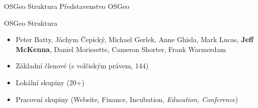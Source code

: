 \documentclass[xcolor=dvipsnames]{beamer}
\begin{document}
\begin{frame}{OSGeo Struktura}
    Představenstvo OSGeo
    \begin{center}
    \end{center}

\end{frame}
\begin{frame}{OSGeo Struktura}
\begin{itemize}
    \item Peter Batty, Jáchym Čepický, Michael Gerlek, Anne Ghisla, Mark Lucas,
        {\bf Jeff McKenna}, Daniel Morissette, Cameron Shorter, Frank Warmerdam
    \item Základní členové (s volčiským právem, 144)
            \pause
    \item Lokální skupiny  (20+)
            \pause
    \item Pracovní skupiny (Website, Finance, Incubation, {\em Education, Conference})
\end{itemize}
\end{frame}
\end{document}
